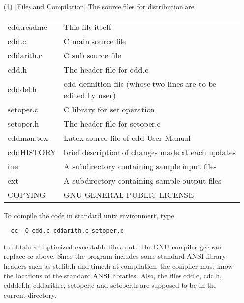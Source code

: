 \begin{itemize}

\item[(1)] [Files and Compilation] The source files for distribution are

\begin{tabular}{ll}
     cdd.readme  &   This file itself\\
     cdd.c       &   C main source file\\
     cddarith.c  &   C sub source file\\  
     cdd.h       &   The header file for cdd.c\\
     cdddef.h    &   cdd definition file (whose two lines are to be edited by user)\\
     setoper.c   &   C library for set operation\\
     setoper.h   &   The header file for setoper.c \\
     cddman.tex  &  Latex source file of cdd User Manual\\
     cddHISTORY  &   brief description of changes made at each updates\\
     ine         &   A subdirectory containing sample input files\\
     ext         &   A subdirectory containing sample output files\\
     COPYING     &   GNU GENERAL PUBLIC LICENSE
\end{tabular}

\noindent
To compile the code in standard unix environment, type
\begin{verbatim}
  cc -O cdd.c cddarith.c setoper.c
\end{verbatim}

to obtain an optimized executable file a.out. The GNU compiler
gcc can replace cc above.
Since the program includes some standard ANSI library 
headers such as stdlib.h and time.h at compilation, 
the compiler must know the locations of the standard ANSI libraries.
Also, the files cdd.c, cdd.h, cdddef.h, cddarith.c, setoper.c and setoper.h are supposed to be
in the current directory.


\end{itemize}
